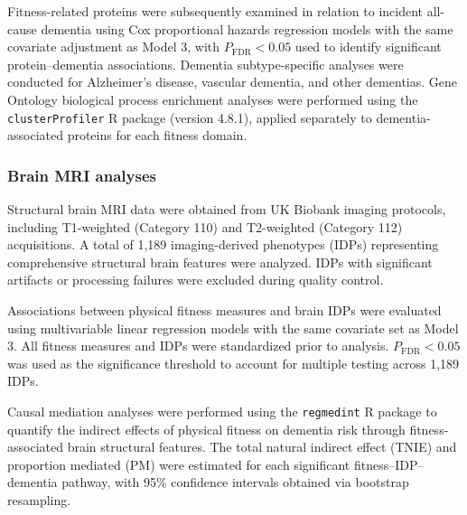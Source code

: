 \documentclass{article}
\begin{document}
Fitness-related proteins were subsequently examined in relation to incident all-cause dementia using Cox proportional hazards regression models with the same covariate adjustment as Model 3, with $P_{\text{FDR}}<0.05$ used to identify significant protein–dementia associations. Dementia subtype-specific analyses were conducted for Alzheimer's disease, vascular dementia, and other dementias. Gene Ontology biological process enrichment analyses were performed using the \texttt{clusterProfiler} R package (version 4.8.1), applied separately to dementia-associated proteins for each fitness domain.

\subsubsection*{Brain MRI analyses}

Structural brain MRI data were obtained from UK Biobank imaging protocols, including T1-weighted (Category 110) and T2-weighted (Category 112) acquisitions. A total of 1,189 imaging-derived phenotypes (IDPs) representing comprehensive structural brain features were analyzed. IDPs with significant artifacts or processing failures were excluded during quality control.

Associations between physical fitness measures and brain IDPs were evaluated using multivariable linear regression models with the same covariate set as Model 3. All fitness measures and IDPs were standardized prior to analysis. $P_{\text{FDR}}<0.05$ was used as the significance threshold to account for multiple testing across 1,189 IDPs.

Causal mediation analyses were performed using the \texttt{regmedint} R package \cite{li2023effect} to quantify the indirect effects of physical fitness on dementia risk through fitness-associated brain structural features. The total natural indirect effect (TNIE) and proportion mediated (PM) were estimated for each significant fitness–IDP–dementia pathway, with 95\% confidence intervals obtained via bootstrap resampling.
\end{document}
